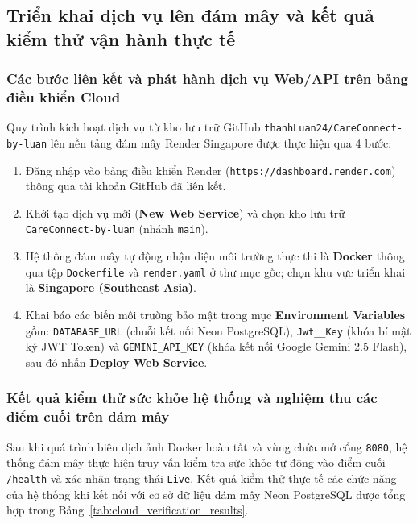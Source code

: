\subsection{Triển khai dịch vụ lên đám mây và kết quả kiểm thử vận hành thực tế}

\subsubsection{Các bước liên kết và phát hành dịch vụ Web/API trên bảng điều khiển Cloud}

Quy trình kích hoạt dịch vụ từ kho lưu trữ GitHub \texttt{thanhLuan24/CareConnect-by-luan} lên nền tảng đám mây Render Singapore được thực hiện qua 4 bước:
\begin{enumerate}
    \item Đăng nhập vào bảng điều khiển Render (\texttt{https://dashboard.render.com}) thông qua tài khoản GitHub đã liên kết.
    \item Khởi tạo dịch vụ mới (\textbf{New Web Service}) và chọn kho lưu trữ \texttt{CareConnect-by-luan} (nhánh \texttt{main}).
    \item Hệ thống đám mây tự động nhận diện môi trường thực thi là \textbf{Docker} thông qua tệp \texttt{Dockerfile} và \texttt{render.yaml} ở thư mục gốc; chọn khu vực triển khai là \textbf{Singapore (Southeast Asia)}.
    \item Khai báo các biến môi trường bảo mật trong mục \textbf{Environment Variables} gồm: \texttt{DATABASE\_URL} (chuỗi kết nối Neon PostgreSQL), \texttt{Jwt\_\_Key} (khóa bí mật ký JWT Token) và \texttt{GEMINI\_API\_KEY} (khóa kết nối Google Gemini 2.5 Flash), sau đó nhấn \textbf{Deploy Web Service}.
\end{enumerate}

\subsubsection{Kết quả kiểm thử sức khỏe hệ thống và nghiệm thu các điểm cuối trên đám mây}

Sau khi quá trình biên dịch ảnh Docker hoàn tất và vùng chứa mở cổng \texttt{8080}, hệ thống đám mây thực hiện truy vấn kiểm tra sức khỏe tự động vào điểm cuối \texttt{/health} và xác nhận trạng thái \texttt{Live}. Kết quả kiểm thử thực tế các chức năng của hệ thống khi kết nối với cơ sở dữ liệu đám mây Neon PostgreSQL được tổng hợp trong Bảng~\ref{tab:cloud_verification_results}.

